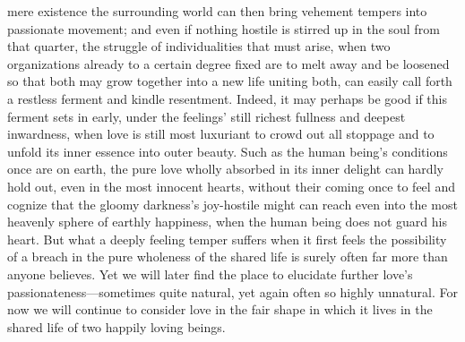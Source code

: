 \documentclass[12pt,a4paper]{book}
\begin{document}
mere existence the surrounding world can then bring vehement tempers into
passionate movement; and even if nothing hostile is stirred up in the soul
from that quarter, the struggle of individualities that must arise, when
two organizations already to a certain degree fixed are to melt away and be
loosened so that both may grow together into a new life uniting both, can
easily call forth a restless ferment and kindle resentment. Indeed, it may
perhaps be good if this ferment sets in early, under the feelings' still
richest fullness and deepest inwardness, when love is still most luxuriant
to crowd out all stoppage and to unfold its inner essence into outer
beauty. Such as the human being's conditions once are on earth, the pure
love wholly absorbed in its inner delight can hardly hold out, even in the
most innocent hearts, without their coming once to feel and cognize that
the gloomy darkness's joy-hostile might can reach even into the most
heavenly sphere of earthly happiness, when the human being does not guard
his heart. But what a deeply feeling temper suffers when it first feels the
possibility of a breach in the pure wholeness of the shared life is surely
often far more than anyone believes. Yet we will later find the place to
elucidate further love's passionateness---sometimes quite natural, yet again
often so highly unnatural. For now we will continue to consider love in the
fair shape in which it lives in the shared life of two happily loving
beings.
\end{document}
